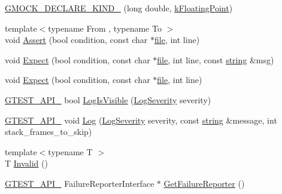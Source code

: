 \begin{DoxyCompactItemize}
\item 
\hyperlink{namespacetesting_1_1internal_af46fdd94d8aea0da729b554de443315f}{G\+M\+O\+C\+K\+\_\+\+D\+E\+C\+L\+A\+R\+E\+\_\+\+K\+I\+N\+D\+\_\+} (long double, \hyperlink{namespacetesting_1_1internal_aa8747bda20137c9aa7f846dee830e686acdce59b8c136926ace18aa9c2995878d}{k\+Floating\+Point})
\item 
{\footnotesize template$<$typename From , typename To $>$ }\\void \hyperlink{namespacetesting_1_1internal_a7a259643b7f2d23ce2b757728df42c99}{Assert} (bool condition, const char $\ast$\hyperlink{_07copy_08_2_read_camera_model_8m_a151631b2fd2bb776ef06c9f440a7ed74}{file}, int line)
\item 
void \hyperlink{namespacetesting_1_1internal_ab3000fc56be000e4fa6ed7cdcfee3106}{Expect} (bool condition, const char $\ast$\hyperlink{_07copy_08_2_read_camera_model_8m_a151631b2fd2bb776ef06c9f440a7ed74}{file}, int line, const \hyperlink{namespacetesting_1_1internal_a8e8ff5b11e64078831112677156cb111}{string} \&msg)
\item 
void \hyperlink{namespacetesting_1_1internal_a0dfe8a755bd02aa5ea162764b61a9d97}{Expect} (bool condition, const char $\ast$\hyperlink{_07copy_08_2_read_camera_model_8m_a151631b2fd2bb776ef06c9f440a7ed74}{file}, int line)
\item 
\hyperlink{gtest-port_8h_aa73be6f0ba4a7456180a94904ce17790}{G\+T\+E\+S\+T\+\_\+\+A\+P\+I\+\_\+} bool \hyperlink{namespacetesting_1_1internal_a69ffdba5ee36743e88d8f89b79e566ff}{Log\+Is\+Visible} (\hyperlink{namespacetesting_1_1internal_a203d1a8a2147a53d12bbdae40d443914}{Log\+Severity} severity)
\item 
\hyperlink{gtest-port_8h_aa73be6f0ba4a7456180a94904ce17790}{G\+T\+E\+S\+T\+\_\+\+A\+P\+I\+\_\+} void \hyperlink{namespacetesting_1_1internal_ac0bc151763a8187d74387c4b2ba685c9}{Log} (\hyperlink{namespacetesting_1_1internal_a203d1a8a2147a53d12bbdae40d443914}{Log\+Severity} severity, const \hyperlink{namespacetesting_1_1internal_a8e8ff5b11e64078831112677156cb111}{string} \&message, int stack\+\_\+frames\+\_\+to\+\_\+skip)
\item 
{\footnotesize template$<$typename T $>$ }\\T \hyperlink{namespacetesting_1_1internal_a3316c24e8a79f5def3e85d763ae50854}{Invalid} ()
\item 
\hyperlink{gtest-port_8h_aa73be6f0ba4a7456180a94904ce17790}{G\+T\+E\+S\+T\+\_\+\+A\+P\+I\+\_\+} Failure\+Reporter\+Interface $\ast$ \hyperlink{namespacetesting_1_1internal_aa261c22df383e9007129c92e36e30e62}{Get\+Failure\+Reporter} ()

\end{DoxyCompactItemize}
